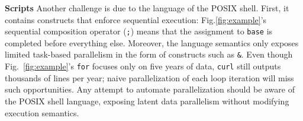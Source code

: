 \documentclass[sigplan, review, screen, anonymous]{acmart}
\newcommand{\heading}[1]{\vspace{4pt}\noindent\textbf{#1}\enspace}
\newcommand{\ttt}[1]{\texttt{#1}}
\newcommand{\kk}[1]{[{\color{magenta}kk: #1}]}
\begin{document}


\heading{Scripts} %
Another challenge is due to the language of the POSIX shell. %
First, it contains constructs that enforce sequential execution:
   Fig.\ref{fig:example}'s sequential composition operator (\ttt{;}) means that the assignment to \ttt{base} is completed before everything else.
Moreover, the language semantics only exposes limited task-based parallelism in the form of constructs such as \ttt{&}. %
Even though Fig.~\ref{fig:example}'s \ttt{for} focuses only on five years of data, \ttt{curl} still outputs thousands of lines per year;
  naive parallelization of each loop iteration will miss such opportunities.
Any attempt to automate parallelization should be aware of the POSIX shell language, exposing latent data parallelism without modifying execution semantics.
\end{document}
